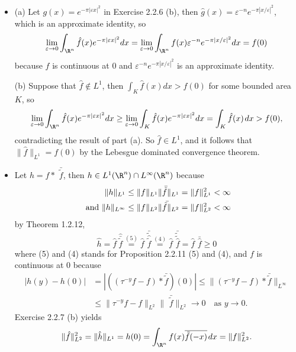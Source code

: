 \begin{itemize}
\item[2.2.7]

(a) Let $g(x)=e^{-\pi|\varepsilon x|^2}$ in Exercise 2.2.6 (b), 
then $\hat{g}(x)=\varepsilon^{-n}e^{-\pi|x/\varepsilon|^2}$, 
which is an approximate identity, so 
$$\lim_{\varepsilon\rightarrow0}\int_{\R^n}\hat{f}(x)e^{-\pi|\varepsilon x|^2}dx
=\lim_{\varepsilon\rightarrow0}\int_{\R^n}f(x)\varepsilon^{-n}e^{-\pi|x/\varepsilon|^2}dx=f(0)$$
because $f$ is continuous at $0$ and 
$\varepsilon^{-n}e^{-\pi|x/\varepsilon|^2}$ is an approximate identity.

(b) Suppose that $\hat{f}\notin L^1$, then $\int_K \hat{f}(x)dx>f(0)$ 
for some bounded area $K$, so 
$$\lim_{\varepsilon\rightarrow0}\int_{\R^n}\hat{f}(x)e^{-\pi|\varepsilon x|^2}dx
\geq\lim_{\varepsilon\rightarrow0}\int_K\hat{f}(x)e^{-\pi|\varepsilon x|^2}dx=\int_K \hat{f}(x)\>dx>f(0),$$
contradicting the result of part (a). So $\hat{f}\in L^1$, and it follows that 
$\|\hat{f}\|_{L^1}=f(0)$ by the Lebesgue dominated convergence theorem.

\item[2.2.8]

Let $h=f*\,\,\bar{\!\!\tilde{f}}$, then $h\in L^1(\R^n)\cap L^\infty(\R^n)$ because
\begin{align*}
    \|h\|_{L^1}&\leq\|f\|_{L^1}\|\bar{\tilde{f}}\|_{L^1}=\|f\|_{L^1}^2<\infty\\
    {\ \rm and\ } \|h\|_{L^\infty}&\leq\|f\|_{L^2}\|\,\,\bar{\!\!\tilde{f}}\|_{L^2}=\|f\|_{L^2}^2<\infty
\end{align*}
by Theorem 1.2.12, $$\hat{h}=\hat{f}\ \hat{\bar{\!\!\tilde{f}}}\overset{(5)}{=}
\hat{f}\,\,\bar{\tilde{\hat{\!\!\tilde{f}}}}\overset{(4)}{=}
\hat{f}\,\,\bar{\tilde{\tilde{\!\!\hat{f}}}}=\hat{f}\,\,\bar{\!\!\hat{f}}\geq0$$
where (5) and (4) stands for Proposition 2.2.11 (5) and (4), 
and $f$ is continuous at $0$ because
\begin{align*}
    |h(y)-h(0)|&=|((\tau^{-y}f-f)*\bar{\tilde{f}})(0)|\leq\|(\tau^{-y}f-f)*\bar{\tilde{f}}\|_{L^\infty}\\
    &\leq\|\tau^{-y}f-f\|_{L^2}\|\,\,\bar{\!\!\tilde{f}}\|_{L^2}\rightarrow0\quad\text{as } y\rightarrow0.
\end{align*}
Exercise 2.2.7 (b) yields $$\|\hat{f}\|_{L^2}^2=\|\hat{h}\|_{L^1}=h(0)=\int_{\R^n}f(x)\overline{\tilde{f}(-x)}\>dx=\|f\|_{L^2}^2.$$


\end{itemize}

